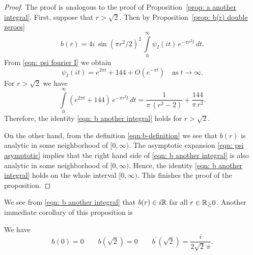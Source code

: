 \begin{proof}
The proof is analogous to the proof of Proposition~\ref{prop: a another integral}.
First, suppose that $r>\sqrt{2}$. Then by Proposition~\ref{prop: b(r) double zeroes}
$$b(r)=4i\,\sin(\pi r^2/2)^2\,\int\limits_{0}^{\infty}\psi_I(it)\,e^{-\pi r^2 t}\,dt. $$
From \eqref{eqn: psi fourier I} we obtain
\begin{equation}\label{eqn: psi asymptotic}
\psi_I(it)=e^{2\pi t}+144+O(e^{-\pi t})\quad\mbox{as}\;t\to\infty.
\end{equation}
For $r>\sqrt{2}$ we have
\begin{equation}
\int\limits_0^\infty \left(e^{2\pi t}+144\right)\,e^{-\pi r^2 t}\,dt
=\frac{1}{\pi\,(r^2-2)}+\frac{144}{\pi\,r^2}.\end{equation}
Therefore, the identity \eqref{eqn: b another integral} holds for $r>\sqrt{2}$.

On the other hand, from the definition \eqref{eqn:b-definition} we see that $b(r)$ is analytic in some neighborhood of $[0,\infty)$. The asymptotic expansion \eqref{eqn: psi asymptotic} implies that the right hand side of \eqref{eqn: b another integral} is also analytic in some neighborhood of $[0,\infty)$. Hence, the identity \eqref{eqn: b another integral} holds on the whole interval $[0,\infty)$. This finishes the proof of the proposition.
\end{proof}
We see from \eqref{eqn: b another integral} that $b(r)\in i\mathbb{R}$ far all $r\in\mathbb{R}_\geq{0}$. Another immediate corollary of this proposition is
\begin{proposition}\label{prop: b values}
We have
\begin{equation}\label{eqn: b values}
b(0)=0\qquad
b(\sqrt{2})=0\qquad
b^\prime(\sqrt{2})=\frac{i}{2\sqrt{2}\,\pi}.
\end{equation}
\end{proposition}
